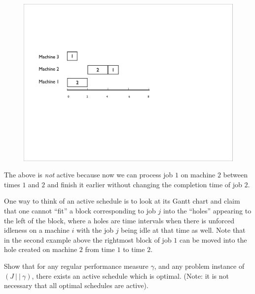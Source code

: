 \documentclass[11pt]{article}
\begin{document}
\begin{figure}[h]
\begin{center}
\includegraphics[scale=0.4]{nonactive-schedule}
\end{center}
\end{figure}

The above is {\em not} active because now we can process job $1$ on machine $2$ between times $1$ and $2$ and finish it earlier without changing the completion time of job $2$. 

One way to think of an active schedule is to look at its Gantt chart and claim that one cannot ``fit''  a block corresponding to job $j$ into the ``holes'' appearing to the left of the block, where a holes are time intervals when there is unforced idleness on a machine $i$ with the 
job $j$ being idle at that time as well. Note that in the second example above the rightmost block of job $1$ can be moved into the hole created on machine $2$ from time $1$ to time $2$.

\begin{exercise}
Show that for any regular performance measure $\gamma$, and any problem instance of $(J~|~|~\gamma)$, there exists an active schedule which is optimal. (Note: it is not necessary that all optimal schedules are active).
\end{exercise}
\end{document}
